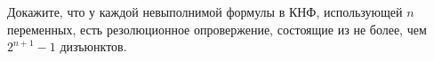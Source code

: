 Докажите, что у каждой невыполнимой формулы в КНФ, использующей $n$ переменных, есть резолюционное
опровержение, состоящие из не более, чем $2^{n + 1} - 1$ дизъюнктов.
